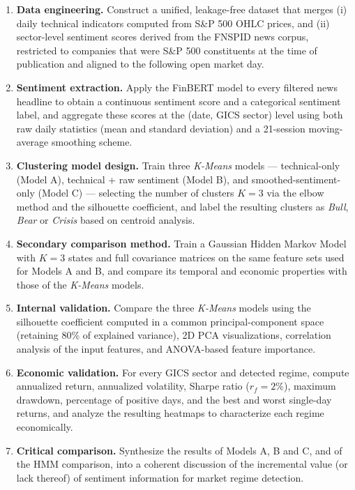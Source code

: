 \begin{enumerate}
  \item \textbf{Data engineering.} Construct a unified, leakage-free
  dataset that merges (i) daily technical indicators computed from S\&P
  500 OHLC prices, and (ii) sector-level sentiment scores derived from the
  FNSPID news corpus, restricted to companies that were S\&P 500
  constituents at the time of publication and aligned to the following
  open market day.
  \item \textbf{Sentiment extraction.} Apply the FinBERT model to every
  filtered news headline to obtain a continuous sentiment score and a
  categorical sentiment label, and aggregate these scores at the
  (date, GICS sector) level using both raw daily statistics (mean and
  standard deviation) and a 21-session moving-average smoothing scheme.
  \item \textbf{Clustering model design.} Train three \textit{K-Means}
  models --- technical-only (Model A), technical + raw sentiment (Model
  B), and smoothed-sentiment-only (Model C) --- selecting the number of
  clusters $K=3$ via the elbow method and the silhouette coefficient, and
  label the resulting clusters as \emph{Bull}, \emph{Bear} or
  \emph{Crisis} based on centroid analysis.
  \item \textbf{Secondary comparison method.} Train a Gaussian Hidden
  Markov Model with $K=3$ states and full covariance matrices on the same
  feature sets used for Models A and B, and compare its temporal and
  economic properties with those of the \textit{K-Means} models.
  \item \textbf{Internal validation.} Compare the three \textit{K-Means}
  models using the silhouette coefficient computed in a common
  principal-component space (retaining 80\% of explained variance), 2D
  PCA visualizations, correlation analysis of the input features, and
  ANOVA-based feature importance.
  \item \textbf{Economic validation.} For every GICS sector and detected
  regime, compute annualized return, annualized volatility, Sharpe ratio
  ($r_f = 2\%$), maximum drawdown, percentage of positive days, and the
  best and worst single-day returns, and analyze the resulting heatmaps to
  characterize each regime economically.
  \item \textbf{Critical comparison.} Synthesize the results of Models
  A, B and C, and of the HMM comparison, into a coherent discussion of the
  incremental value (or lack thereof) of sentiment information for market
  regime detection.
\end{enumerate}

